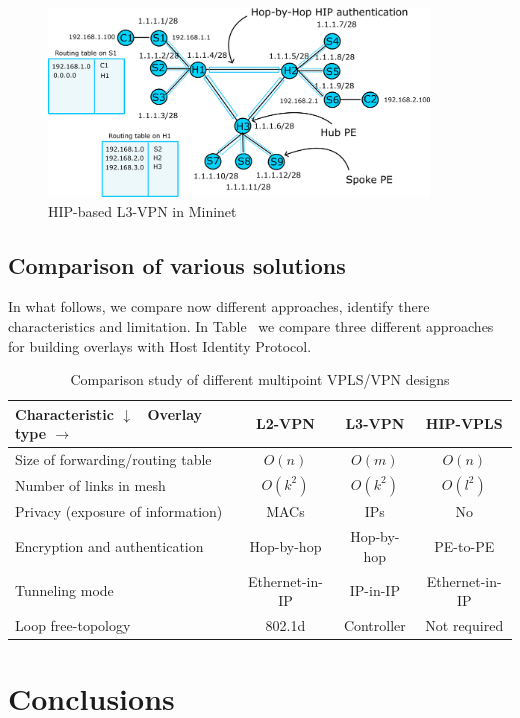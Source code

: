 \begin{figure}[h!]
    \centering
    \includegraphics[width=0.9\textwidth]{graphics/arch.png}
    \caption{HIP-based L3-VPN in Mininet}
    \label{fig:l3vpn}
\end{figure}

\section{Comparison of various solutions}

In what follows, we compare now different approaches, identify there
characteristics and limitation. In Table~\cite{tab:analysis} we 
compare three different approaches for building overlays with Host 
Identity Protocol. 

\begin{table}
    \small
    \begin{tabular}{|l|c|c|c|}
    \hline
    Characteristic $\downarrow$ \ Overlay type $\rightarrow$ & L2-VPN & L3-VPN & HIP-VPLS \\\hline
    Size of forwarding/routing table & $O(n)$ & $O(m)$ & $O(n)$\\\hline
    Number of links in mesh & $O(k^2)$ & $O(k^2)$ & $O(l^2)$ \\\hline
    Privacy (exposure of information) & MACs & IPs & No \\\hline
    Encryption and authentication & Hop-by-hop & Hop-by-hop & PE-to-PE \\\hline
    Tunneling mode & Ethernet-in-IP & IP-in-IP & Ethernet-in-IP \\\hline
    Loop free-topology & 802.1d & Controller & Not required \\\hline
    \end{tabular}
    \label{tab:analysis}
    \caption {Comparison study of different multipoint VPLS/VPN designs}
\end{table}

\chapter{Conclusions}






